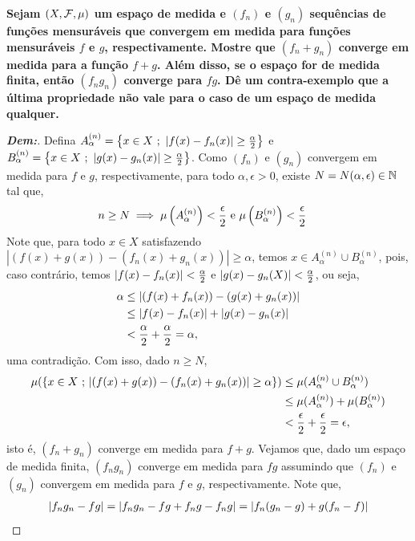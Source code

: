 \textbf{Sejam $(X, \mathcal F, \mu)$ um espaço de medida e $(f_n)$ e $(g_n)$ 
sequências de funções mensuráveis que convergem em medida para funções mensuráveis 
$f$ e $g$, respectivamente. Mostre que $(f_n + g_n)$ converge em medida para a função 
$f+g$. Além disso, se o espaço for de medida finita, então $(f_ng_n)$ converge para $fg$. 
Dê um contra-exemplo que a última propriedade não vale para o caso de um espaço de medida 
qualquer.}
\begin{proof}[\textbf{Dem:}] Defina 
$A_\alpha^{(n)} = \left\{x \in X \text{ ; } \left|f(x) - f_n(x)\right| \ge \frac{\alpha}{2}\right\}$
e 
$B_\alpha^{(n)} = \left\{x \in X \text{ ; } \left|g(x) - g_n(x)\right| \ge \frac{\alpha}{2}\right\}$.
Como $(f_n)$ e $(g_n)$ convergem em medida para $f$ e $g$,
respectivamente, para todo $\alpha, \epsilon>0$, existe $N = N(\alpha, \epsilon) \in \mathbb N$
tal que,
\begin{align*}
n \ge N &\implies \mu\left(A_\alpha^{(n)}\right)<\frac{\epsilon}{2} \text{ e }
\mu\left(B_\alpha^{(n)}\right)< \frac{\epsilon}{2}
\end{align*}
Note que, para todo $x \in X$ satisfazendo $|(f(x) + g(x)) - (f_n(x) + g_n(x))| \ge \alpha$,
temos $x \in A_\alpha^{(n)}\cup B_\alpha^{(n)}$, pois, caso contrário, temos 
$\left|f(x) - f_n(x)\right| < \frac{\alpha}{2}$ e $\left|g(x) - g_n(X)\right| <\frac{\alpha}{2}$,
ou seja,
\begin{align*}
  \alpha &\le \left|(f(x) + f_n(x)) - (g(x) + g_n(x))\right| \\
  &\le \left|f(x) - f_n(x)\right|
  + \left|g(x) - g_n(x)\right|\\
  &< \frac{\alpha}{2}+ \frac{\alpha}{2} = \alpha,
\end{align*}
uma contradição. Com isso, dado $n \ge N$,
\begin{align*}
  \mu(\left\{x \in X \text{ ; } |(f(x) + g(x)) - (f_n(x) + g_n(x))| \ge \alpha\right\})
  &\le \mu(A_\alpha^{(n)} \cup B_\alpha^{(n)})\\
  &\le \mu(A_\alpha^{(n)}) + \mu(B_\alpha^{(n)})\\
  &< \frac{\epsilon}{2} + \frac{\epsilon}{2} = \epsilon,
\end{align*}
isto é, $(f_n + g_n)$ converge em medida para $f+g$. Vejamos que, 
dado um espaço de medida finita, $(f_ng_n)$ converge em medida para $fg$ assumindo
que $(f_n)$ e $(g_n)$ convergem em medida para $f$ e $g$, respectivamente. Note que, 
\begin{align*}
  \mparth{f_ng_n - fg} &= \mparth{f_ng_n - fg +f_ng - f_ng}
  =\mparth{f_n(g_n - g) + g(f_n -f)}\\

\end{align*}
\end{proof}
